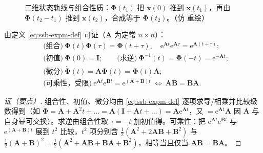 \begin{figure}[ht]
\centering
{}
\caption{二维状态轨线与组合性质：$\boldsymbol{\Phi}(t_1)$ 把 $\mathbf{x}(0)$ 推到 $\mathbf{x}(t_1)$，再由 $\boldsymbol{\Phi}(t_2-t_1)$ 推到 $\mathbf{x}(t_2)$，合成等于 $\boldsymbol{\Phi}(t_2)$。（仿 \cite{liubao2006modern} 重绘）}
\label{fig:ssb-phaseflow}
\end{figure}

\begin{proposition}[状态转移矩阵的基本性质]\label{prop:ssb-stm}
由定义 \cref{eq:ssb-expm-def} 可证（$\mathbf{A}$ 为定常 $n\times n$）：
\begin{align}
  &\text{(组合)}\ \boldsymbol{\Phi}(t)\boldsymbol{\Phi}(\tau)=\boldsymbol{\Phi}(t+\tau),\quad \mathrm{e}^{\mathbf{A}t}\mathrm{e}^{\mathbf{A}\tau}=\mathrm{e}^{\mathbf{A}(t+\tau)};\label{eq:ssb-stm-compose}\\
  &\text{(初值)}\ \boldsymbol{\Phi}(0)=\mathbf{I};\qquad \text{(求逆)}\ \boldsymbol{\Phi}^{-1}(t)=\boldsymbol{\Phi}(-t)=\mathrm{e}^{-\mathbf{A}t};\label{eq:ssb-stm-inv}\\
  &\text{(微分)}\ \dot{\boldsymbol{\Phi}}(t)=\mathbf{A}\boldsymbol{\Phi}(t)=\boldsymbol{\Phi}(t)\mathbf{A};\label{eq:ssb-stm-deriv}\\
  &\text{(可乘性，受限)}\ \mathrm{e}^{\mathbf{A}t}\mathrm{e}^{\mathbf{B}t}=\mathrm{e}^{(\mathbf{A}+\mathbf{B})t}\ \Longleftrightarrow\ \mathbf{A}\mathbf{B}=\mathbf{B}\mathbf{A}.\label{eq:ssb-stm-commute}
\end{align}
\end{proposition}
\begin{proof}[证（要点）]
组合性、初值、微分均由 \cref{eq:ssb-expm-def} 逐项求导/相乘并比较级数得到（如 $\dot{\boldsymbol{\Phi}}=\mathbf{A}+\mathbf{A}^2 t+\dots=\mathbf{A}(\mathbf{I}+\mathbf{A}t+\dots)=\mathbf{A}\mathrm{e}^{\mathbf{A}t}$，又 $=\mathrm{e}^{\mathbf{A}t}\mathbf{A}$ 因 $\mathbf{A}$ 与自身幂可交换）。求逆由组合性取 $\tau=-t$ 加初值得。可乘性：把 $\mathrm{e}^{\mathbf{A}t}\mathrm{e}^{\mathbf{B}t}$ 与 $\mathrm{e}^{(\mathbf{A}+\mathbf{B})t}$ 展到 $t^2$ 比较，$t^2$ 项分别含 $\tfrac12(\mathbf{A}^2+2\mathbf{A}\mathbf{B}+\mathbf{B}^2)$ 与 $\tfrac12(\mathbf{A}+\mathbf{B})^2=\tfrac12(\mathbf{A}^2+\mathbf{A}\mathbf{B}+\mathbf{B}\mathbf{A}+\mathbf{B}^2)$，相等当且仅当 $\mathbf{A}\mathbf{B}=\mathbf{B}\mathbf{A}$。
\end{proof}

